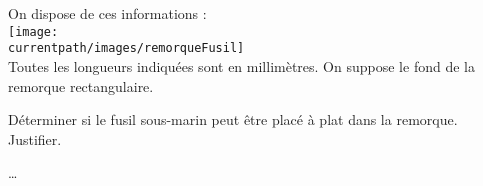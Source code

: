 \begin{exercice*}
    On dispose de ces informations :\\
    \texttt{[image: \\currentpath/images/remorqueFusil]}\\
    Toutes les longueurs indiquées sont en millimètres. On suppose le fond de la remorque rectangulaire.

    \medskip
    Déterminer si le fusil sous-marin peut être placé \og à plat \fg{} dans la remorque. Justifier.
\end{exercice*}
\begin{corrige}
    \dots
\end{corrige}

